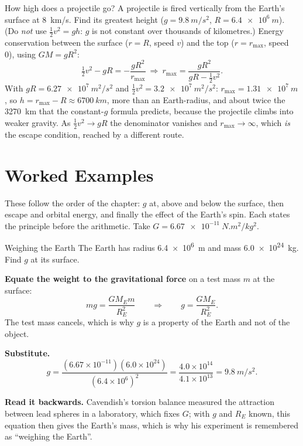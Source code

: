 
\begin{exbox}{How high does a projectile go?}
A projectile is fired vertically from the Earth's surface at \SI{8}{km/s}. Find its greatest height
($g=\SI{9.8}{m/s^2}$, $R=\SI{6.4e6}{m}$).
(Do \emph{not} use $\tfrac{1}{2} v^2=gh$: $g$ is not constant over thousands of kilometres.) Energy conservation between the surface ($r=R$, speed $v$) and the top
($r=r_{\max}$, speed 0), using $GM=gR^2$:
\[
\tfrac{1}{2} v^2-gR=-\frac{gR^2}{r_{\max}}\ \Rightarrow\ r_{\max}=\frac{gR^2}{gR-\tfrac{1}{2} v^2}.
\]
With $gR=\SI{6.27e7}{m^2/s^2}$ and $\tfrac{1}{2} v^2=\SI{3.2e7}{m^2/s^2}$: $r_{\max}=\SI{1.31e7}{m}$, so
$h=r_{\max}-R\approx\SI{6700}{km}$, more than an Earth-radius, and about twice the \SI{3270}{km} that the
constant-$g$ formula predicts, because the projectile climbs into weaker gravity. As $\tfrac{1}{2} v^2\to gR$
the denominator vanishes and $r_{\max}\to\infty$, which \emph{is} the escape condition, reached by a
different route. 
\end{exbox}

\section{Worked Examples}

These follow the order of the chapter: $g$ at, above and below the surface, then escape and orbital
energy, and finally the effect of the Earth's spin. Each states the principle before the arithmetic. Take $G=\SI{6.67e-11}{N.m^2/kg^2}$.

\begin{exbox}{Weighing the Earth}
The Earth has radius \SI{6.4e6}{m} and mass \SI{6.0e24}{kg}. Find $g$ at its surface.

 \textbf{Equate the weight to the gravitational force} on a test mass $m$ at the surface:
\[
mg=\frac{GM_Em}{R_E^{2}}
\qquad\Longrightarrow\qquad
g=\frac{GM_E}{R_E^{2}} .
\]
The test mass cancels, which is why $g$ is a property of the Earth and not of the object.

 \textbf{Substitute.}
\[
g=\frac{(6.67\times10^{-11})(6.0\times10^{24})}{(6.4\times10^{6})^{2}}
=\frac{4.0\times10^{14}}{4.1\times10^{13}}=\SI{9.8}{m/s^2}.
\]

\smallskip
\textbf{Read it backwards.} Cavendish's torsion balance measured the attraction between lead spheres in a
laboratory, which fixes $G$; with $g$ and $R_E$ known, this equation then gives the Earth's mass, which is
why his experiment is remembered as ``weighing the Earth''.
\end{exbox}

